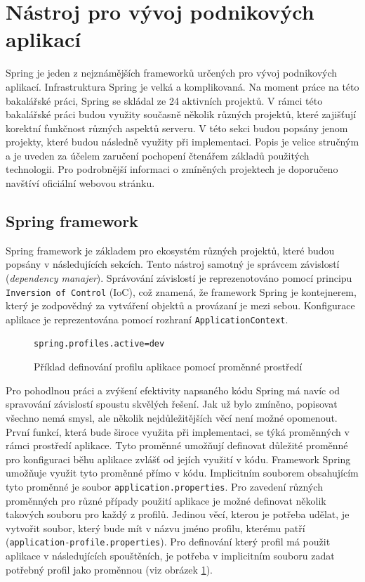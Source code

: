 \section{Nástroj pro vývoj podnikových aplikací}\label{resere:j2ee}
    Spring je jeden z nejznámějších frameworků určených pro vývoj podnikových aplikací. Infrastruktura Spring je velká a komplikovaná. Na moment práce na této bakalářské práci, Spring se skládal ze 24 aktivních projektů. V rámci této bakalářské práci budou využity současně několik různých projektů, které zajišťují korektní funkčnost různých aspektů serveru. V této sekci budou popsány jenom projekty, které budou následně využity při implementaci. Popis je velice stručným a je uveden za účelem zaručení pochopení čtenářem základů použitých technologii. Pro podrobnější informaci o zmíněných projektech je doporučeno navštíví oficiální webovou stránku\cite{spring-projects}.
    
    \subsection{Spring framework}
        Spring framework je základem pro ekosystém různých projektů, které budou popsány v následujících sekcích\cite{spring-framework}. Tento nástroj samotný je správcem závislostí (\textit{dependency manajer}). Správování závislostí je reprezenotováno pomocí principu \texttt{Inversion of Control} (IoC), což znamená, že framework Spring je kontejnerem, který je zodpovědný za vytváření objektů a provázaní je mezi sebou. Konfigurace aplikace je reprezentována pomocí rozhraní \texttt{ApplicationContext}.
        
        \begin{figure}
            \begin{verbatim}
spring.profiles.active=dev
            \end{verbatim}
            \caption{Příklad definování profilu aplikace pomocí proměnné prostředí} 
            \label{code:current-spring-profile}
        \end{figure}
        Pro pohodlnou práci a zvýšení efektivity napsaného kódu Spring má navíc od spravování závislostí spoustu skvělých řešení. Jak už bylo zmíněno, popisovat všechno nemá smysl, ale několik nejdůležitějších věcí není možné opomenout. První funkcí, která bude široce využita při implementaci, se týká proměnných v rámci prostředí aplikace. Tyto proměnné umožňují definovat důležité proměnné pro konfiguraci běhu aplikace zvlášť od jejích využití v kódu. Framework Spring umožňuje využit tyto proměnné přímo v kódu. Implicitním souborem obsahujícím tyto proměnné je soubor \texttt{application.properties}. Pro zavedení různých proměnných pro různé případy použití aplikace je možné definovat několik takových souboru pro každý z profilů. Jedinou věcí, kterou je potřeba udělat, je vytvořit soubor, který bude mít v názvu jméno profilu, kterému patří (\texttt{application-{profile}.properties}). Pro definování který profil má použit aplikace v následujících spouštěních, je potřeba v implicitním souboru zadat potřebný profil jako proměnnou (viz obrázek \ref{code:current-spring-profile}). 
        
